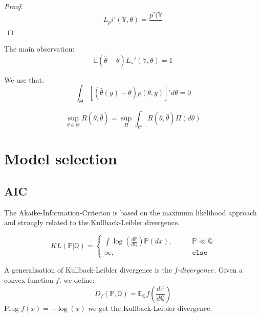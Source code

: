 \begin{proof}
	\begin{equation*}
		L_pi'(\mathbb{Y}, \theta) = \frac{p'(\mathbb{Y}}{}
	\end{equation*}
\end{proof}

The main observation:
\begin{equation*}
	\mathbb{E}(\hat{\theta} - \theta) L_\pi'(\mathbb{Y}, \theta) = 1
\end{equation*}

We use that:
\begin{equation*}
	\int_\Theta [(\hat{\theta}(y) - \theta) p(\theta, y)]' d\theta = 0
\end{equation*}

\begin{theorem}
\begin{equation}
\sup_{\theta \in \Theta} R(\theta, \hat{\theta}) = \sup_{\Pi} \int_{\Theta} R(\theta, \hat{\theta}) \Pi(d\theta)
\end{equation}
\end{theorem}



\section{Model selection}
\subsection{AIC}
The Akaike-Information-Criterion is based on the maximum likelihood approach and strongly related to the Kullback-Leibler divergence. 
\begin{definition}
\begin{equation}
    KL(\mathbb{P}|\mathbb{Q}) = 
    \left\{\begin{aligned}
    \int \log(\frac{d\mathbb{P}}{d\mathbb{Q}})\mathbb{P}(dx),\qquad & \mathbb{P} \ll \mathbb{Q}\\
    \infty,\qquad & \texttt{else}
    \end{aligned}\right.
\end{equation}
\end{definition}

\begin{remark}
	A generalisation of Kullback-Leibler divergence is the $f$-$divergence$. Given a convex function $f$, we define:
\begin{equation*}
	D_f(\mathbb{P}, \mathbb{Q}) = \mathbb{E}_\mathbb{Q} f( \frac{d\mathbb{P}}{d\mathbb{Q}} )
\end{equation*}
Plug $f(x) = -\log(x)$ we get the Kullback-Leibler divergence.
\end{remark}


